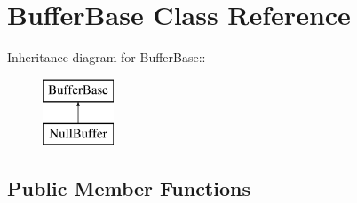 \section{Buffer\-Base Class Reference}
\label{classBufferBase}
Inheritance diagram for Buffer\-Base::\begin{figure}[H]
\begin{center}
\leavevmode
\includegraphics[height=2cm]{classBufferBase}
\end{center}
\end{figure}
\subsection*{Public Member Functions}

